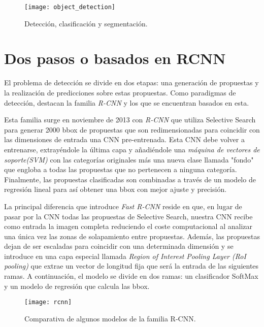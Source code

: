 \begin{figure}[htpb]
  \centering
  \texttt{[image: object\_detection]}
  \caption{Detección, clasificación y segmentación. \cite{2019arXiv190803673W}}
  \label{fig:object-detection}
\end{figure}



\section{Dos pasos o basados en RCNN}
El problema de detección se divide en dos etapas: una generación de propuestas y la realización de predicciones sobre estas propuestas. Como paradigmas de detección, destacan la familia \emph{R-CNN} y los que se encuentran basados en esta.\newline

Esta familia surge en noviembre de 2013 con \emph{R-CNN} \cite{2013arXiv1311.2524G} que utiliza Selective Search \cite{Selective Search for object recognition} para generar 2000 bbox de propuestas que son redimensionadas para coincidir con las dimensiones de entrada una CNN pre-entrenada. Esta CNN debe volver a entrenarse, extrayéndole la última capa y añadiéndole una \emph{máquina de vectores de soporte(SVM)} con las categorías originales más una nueva clase llamada "fondo" que engloba a todas las propuestas que no pertenecen a ninguna categoría. Finalmente, las propuestas clasificadas son combinadas a través de un modelo de regresión lineal para así obtener una bbox con mejor ajuste y precisión.\newline

La principal diferencia que introduce \emph{Fast R-CNN} \cite{2015arXiv150408083G} reside en que, en lugar de pasar por la CNN todas las propuestas de Selective Search, nuestra CNN recibe como entrada la imagen completa reduciendo el coste computacional al analizar una única vez las zonas de solapamiento entre propuestas. Además, las propuestas dejan de ser escaladas para coincidir con una determinada dimensión y se introduce en una capa especial llamada \emph{Region of Interest Pooling Layer (RoI pooling)} que extrae un vector de longitud fija que será la entrada de las siguientes ramas. A continuación, el modelo se divide en dos ramas: un clasificador SoftMax y un modelo de regresión que calcula las bbox. \newline

\begin{figure}[htpb]
  \centering
  \texttt{[image: rcnn]}
  \caption{Comparativa de algunos modelos de la familia R-CNN. \cite{2019arXiv190803673W}}
  \label{fig:r-cnn}
\end{figure}

